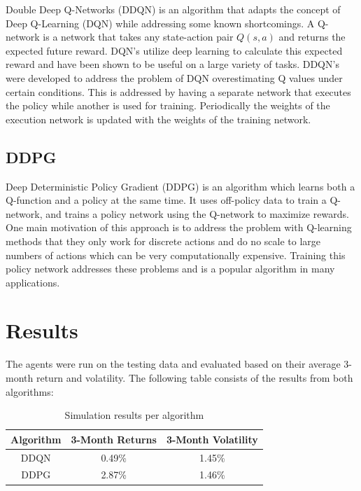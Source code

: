 \documentclass[a4paper]{article}
\begin{document}
Double Deep Q-Networks (DDQN) is an algorithm that adapts the concept of Deep Q-Learning (DQN) while addressing some known shortcomings. A Q-network is a network that takes any state-action pair $Q(s, a)$ and returns the expected future reward. DQN's utilize deep learning to calculate this expected reward and have been shown to be useful on a large variety of tasks. DDQN's were developed to address the problem of DQN overestimating Q values under certain conditions. This is addressed by having a separate network that executes the policy while another is used for training. Periodically the weights of the execution network is updated with the weights of the training network.


\FloatBarrier

\subsection{DDPG}

Deep Deterministic Policy Gradient (DDPG) is an algorithm which learns both a Q-function and a policy at the same time. It uses off-policy data to train a Q-network, and trains a policy network using the Q-network to maximize rewards. One main motivation of this approach is to address the problem with Q-learning methods that they only work for discrete actions and do no scale to large numbers of actions which can be very computationally expensive. Training this policy network addresses these problems and is a popular algorithm in many applications.


\section{Results}

The agents were run on the testing data and evaluated based on their average 3-month return and volatility. The following table consists of the results from both algorithms:

\begin{table}[h!]
	\centering
	\begin{tabular}{||c c c||}
		\hline
		Algorithm & 3-Month Returns & 3-Month Volatility \\ [0.5ex]
		\hline\hline
		DDQN      & 0.49\%          & 1.45\%             \\
		DDPG      & 2.87\%          & 1.46\%             \\ [1ex]
		\hline
	\end{tabular}
	\caption{Simulation results per algorithm}
	\label{table:1}
\end{table}
\end{document}
